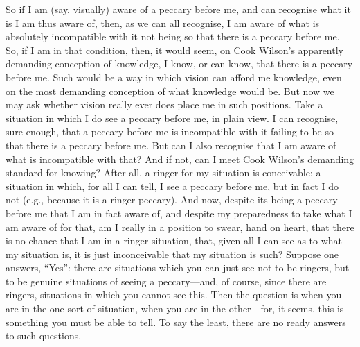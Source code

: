 So if I am (say, visually) aware of a peccary before me, and can recognise what it is I am thus aware of, then, as we can all recognise, I am aware of what is absolutely incompatible with it not being so that there is a peccary before me. So, if I am in that condition, then, it would seem, on Cook Wilson’s apparently demanding conception of knowledge, I know, or can know, that there is a peccary before me. Such would be a way in which vision can afford me knowledge, even on the most demanding conception of what knowledge would be. But now we may ask whether vision really ever does place me in such positions. Take a situation in which I do see a peccary before me, in plain view. I can recognise, sure enough, that a peccary before me is incompatible with it failing to be so that there is a peccary before me. But can I also recognise that I am aware of what is incompatible with that? And if not, can I meet Cook Wilson’s demanding standard for knowing? After all, a ringer for my situation is conceivable: a situation in which, for all I can tell, I see a peccary before me, but in fact I do not (e.g., because it is a ringer-peccary). And now, despite its being a peccary before me that I am in fact aware of, and despite my preparedness to take what I am aware of for that, am I really in a position to swear, hand on heart, that there is no chance that I am in a ringer situation, that, given all I can see as to what my situation is, it is just inconceivable that my situation is such? Suppose one answers, ``Yes'': there are situations which you can just see not to be ringers, but to be genuine situations of seeing a peccary---and, of course, since there are ringers, situations in which you cannot see this. Then the question is when you are in the one sort of situation, when you are in the other---for, it seems, this is something you must be able to tell. To say the least, there are no ready answers to such questions.

